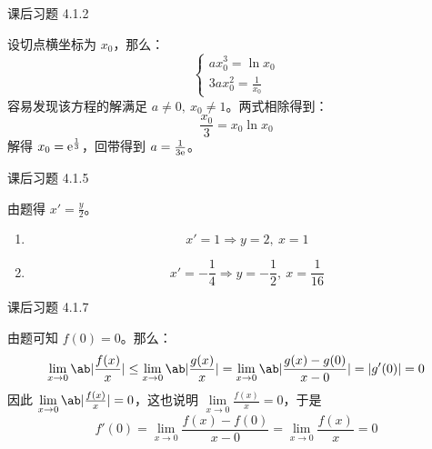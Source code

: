 \begin{problem}
	课后习题 4.1.2

	\begin{solution}
		设切点横坐标为 $x_0$，那么：
		$$
		\begin{cases}
			a x_0^3 = \ln x_0 \\
			3a x_0^2 = \frac{1}{x_0}
		\end{cases}
		$$
		容易发现该方程的解满足 $a \neq 0,\ x_0 \neq 1$。两式相除得到：
		$$
		\frac{x_0}{3} = x_0 \ln x_0
		$$
		解得 $x_0 = \mathrm{e}^{\frac{1}{3}}$，回带得到 $a = \frac{1}{3\mathrm{e}}$。
	\end{solution}
\end{problem}

\begin{problem}
	课后习题 4.1.5

	\begin{solution}
		由题得 $x' = \frac{y}{2}$。

		\begin{enumerate}
			\item[\textbf{1)}]
			$$
			x' = 1 \Rightarrow y = 2,\ x = 1
			$$

			\item[\textbf{2)}]
			$$
			x' = -\frac{1}{4} \Rightarrow y = -\frac{1}{2},\ x = \frac{1}{16}
			$$
		\end{enumerate}
	\end{solution}
\end{problem}

\begin{problem}
	课后习题 4.1.7

	\begin{solution}
		由题可知 $f(0) = 0$。那么：
		$$
		\lim_{x \to 0} \ab|\frac{f(x)}{x}| \le \lim_{x \to 0} \ab|\frac{g(x)}{x}| = \lim_{x \to 0} \ab|\frac{g(x) - g(0)}{x - 0}| = |g'(0)| = 0
		$$
		因此 $\lim\limits_{x \to 0} \ab|\frac{f(x)}{x}| = 0$，这也说明 $\lim\limits_{x \to 0} \frac{f(x)}{x} = 0$，于是
		$$
		f'(0) = \lim_{x \to 0} \frac{f(x) - f(0)}{x - 0} = \lim_{x \to 0} \frac{f(x)}{x} = 0
		$$
	\end{solution}
\end{problem}

